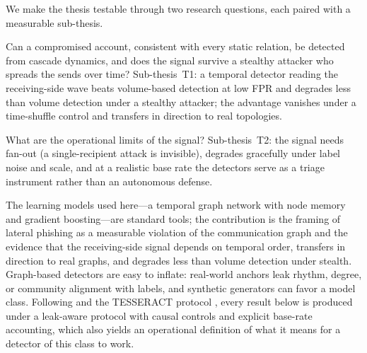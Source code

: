We make the thesis testable through two research questions, each paired with a measurable sub-thesis.
\begin{description}[leftmargin=1.4em,noitemsep,topsep=2pt]
  \item[RQ1 (signal).] Can a compromised account, consistent with every static relation, be detected from
  cascade dynamics, and does the signal survive a stealthy attacker who spreads the sends over time?
  Sub-thesis~T1: a temporal detector reading the receiving-side wave beats volume-based detection at low FPR
  and degrades less than volume detection under a stealthy attacker; the advantage vanishes under a
  time-shuffle control and transfers in direction to real topologies.
  \item[RQ2 (limits).] What are the operational limits of the signal? Sub-thesis~T2: the signal needs
  fan-out (a single-recipient attack is invisible), degrades gracefully under label noise and scale, and at
  a realistic base rate the detectors serve as a triage instrument rather than an autonomous defense.
\end{description}
\noindent The learning models used here---a temporal graph network with node memory and gradient
boosting---are standard tools; the contribution is the framing of lateral phishing as a measurable violation of
the communication graph and the evidence that the receiving-side signal depends on temporal order, transfers in direction to real
graphs, and degrades less than volume detection under stealth. Graph-based detectors are easy to inflate: real-world anchors leak rhythm, degree, or community
alignment with labels, and synthetic generators can favor a model class. Following \citet{arp2022dos} and the
TESSERACT protocol \citep{pendlebury2019tesseract}, every result below is produced under a leak-aware protocol
with causal controls and explicit base-rate accounting, which also yields an operational definition of what it
means for a detector of this class to work.


